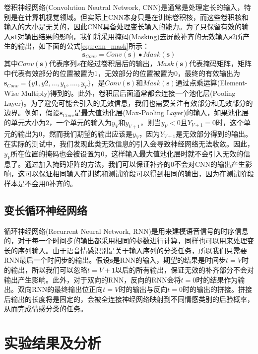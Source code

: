 卷积神经网络(Convolution Neutral Network, CNN)是通常是处理定长的输入，特别是在计算机视觉领域。但实际上CNN本身只是在训练卷积核，而这些卷积核和输入的大小是无关的，因此CNN具备处理变长输入的能力。为了只保留有效的输入$\mathbf{s}1$对输出结果的影响，我们将采用掩码(Masking)去屏蔽补齐的无效输入$\mathbf{s}2$所产生的输出，如下面的公式\ref{equ:cnn_mask}所示：
\begin{equation}
\label{equ:cnn_mask}
    \mathbf{s}_{Conv} = Conv(\mathbf{s}) \bullet Mask(\mathbf{s})
\end{equation}
其中$Conv(\mathbf{s})$代表序列$s$在经过卷积层后的输出，$Mask(\mathbf{s})$代表掩码矩阵，矩阵中代表有效部分的位置被置为1，无效部分的位置被置为0，最终的有效输出为$\mathbf{s}_{Conv}=\{y1,y2,...,y_V,....,y_T\}$，是$Conv(\mathbf{s})$和$Mask(\mathbf{s})$通过点乘运算(Element-Wise Multiply)得到的。此外，卷积层后面通常都会连接一个池化层(Pooling Layer)。为了避免可能会引入的无效信息，我们也需要关注有效部分和无效部分的边界。例如，假设$\mathbf{s}_{Conv}$是最大值池化层(Max-Pooling Layer)的输入，如果池化层的单元大小为2，一个单元的输入为$y_V$和$y_{V+1}$，则当$y_V<0$且$Y_{V+1}=0$时，这个单元的输出为0，然而我们期望的输出应该是$y_V$，因为$Y_{V+1}$是无效部分得到的输出。在实际的测试中，我们发现此类无效信息的引入会导致神经网络无法收敛。因此，$y_V$所在位置的掩码也会被设置为0，这样输入最大值池化层时就不会引入无效的信息了。通过加入掩码矩阵的方法，我们可以保证补齐的0不会对CNN的输出产生影响，这可以保证相同输入在训练和测试阶段可以得到相同的输出，因为在测试阶段样本是不会用0补齐的。

\subsection{变长循环神经网络}
\label{ssec:var_len_rnn}

循环神经网络(Recurrent Neural Network, RNN)是用来建模语音信号的时序信息的，对于每一个时间步的输出都采用相同的参数进行计算，同样也可以用来处理变长的序列输入。由于语音情感识别是关于输入序列的分类任务，所以我们只需要RNN最后一个时间步的输出。假设$\mathbf{s}$是RNN的输入，期望的结果是时间步$t=V$时的输出，所以我们可以忽略$t=V+1$以后的所有输出，保证无效的补齐部分不会对输出产生影响。此外，对于双向的RNN，反向的RNN会将$t=0$时的结果作为输出。双向RNN的最终输出位正向$t=V$时的输出与反向$t=0$时的输出的拼接。拼接后输出的长度将是固定的，会被全连接神经网络映射到不同情感类别的后验概率，从而完成情感分类的任务。

\section{实验结果及分析}
\label{sec:var_len_experiment}

